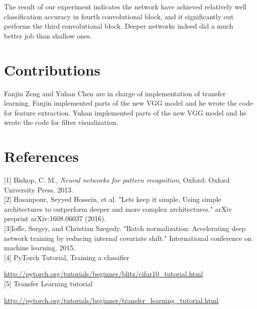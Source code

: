 \documentclass{article}
\begin{document}
The result of our experiment indicates the network have achieved relatively well classification accuracy in fourth convolutional block, and it significantly out performs the third convolutional block. Deeper networks indeed did a much better job than shallow ones.

\newpage

\section{Contributions}
Fanjin Zeng and Yuhan Chen are in charge of implementation of transfer learning. Fanjin implemented parts of the new VGG model and he wrote the code for feature extraction. Yuhan implemented parts of the new VGG model and he wrote the code for filter visualization.


\section{References}
[1] Bishop, C. M., {\it Neural networks for pattern recognition}, Oxford: Oxford University Press, 2013. \\

[2] Hasanpour, Seyyed Hossein, et al. "Lets keep it simple, Using simple architectures to outperform deeper and more complex architectures." arXiv preprint arXiv:1608.06037 (2016). \\

[3]Ioffe, Sergey, and Christian Szegedy. "Batch normalization: Accelerating deep network training by reducing internal covariate shift." International conference on machine learning. 2015.\\

[4] PyTorch Tutorial, Training a classifier
 
 \url{http://pytorch.org/tutorials/beginner/blitz/cifar10_tutorial.html}\\
 
[5] Transfer Learning tutorial

\url{http://pytorch.org/tutorials/beginner/transfer_learning_tutorial.html}
\end{document}
